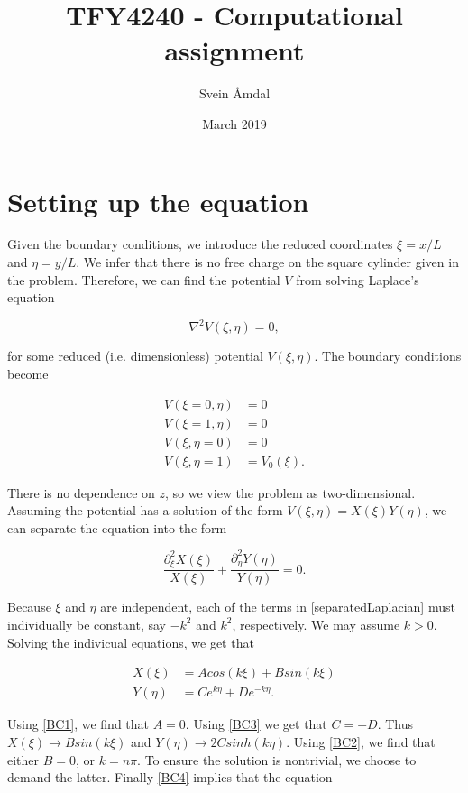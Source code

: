 \documentclass[11p, a4paper, english]{article}
\title{
\huge{TFY4240 - Computational assignment}
}
\author{Svein Åmdal}
\date{March 2019}
\begin{document}
\maketitle

\section{Setting up the equation}
Given the boundary conditions, we introduce the reduced coordinates $\xi = x/L$ and $\eta = y/L$. We infer that there is no free charge on the square cylinder given in the problem. Therefore, we can find the potential $V$ from solving Laplace's equation

\begin{equation}
\nabla^{2}V(\xi, \eta) = 0,
\end{equation}

for some reduced (i.e. dimensionless) potential $V(\xi, \eta)$. The boundary conditions become

\begin{align}
V(\xi=0, \eta) &= 0 \label{BC1} \\ 
V(\xi=1, \eta) &= 0 \label{BC2} \\
V(\xi, \eta=0) &= 0 \label{BC3} \\
V(\xi, \eta=1) &= V_{0}(\xi). \label{BC4}
\end{align}

There is no dependence on $z$, so we view the problem as two-dimensional. Assuming the potential has a solution of the form $V(\xi, \eta) = X(\xi)Y(\eta)$, we can separate the equation into the form

\begin{equation}
\frac{\partial^{2}_{\xi}X(\xi)}{X(\xi)} + \frac{\partial^{2}_{\eta}Y(\eta)}{Y(\eta)} = 0.
\label{separatedLaplacian}
\end{equation}

Because $\xi$ and $\eta$ are independent, each of the terms in \cref{separatedLaplacian} must individually be constant, say $-k^{2}$ and $k^{2}$, respectively. We may assume $k > 0$. Solving the indivicual equations, we get that

\begin{align}
X(\xi) &= Acos(k\xi)+Bsin(k\xi) \\
Y(\eta) &= Ce^{k\eta}+De^{-k\eta}.
\end{align}

Using \cref{BC1}, we find that $A = 0$. Using \cref{BC3} we get that $C=-D$. Thus $X(\xi) \rightarrow Bsin(k\xi)$ and $Y(\eta) \rightarrow 2Csinh(k\eta)$. Using \cref{BC2}, we find that either $B = 0$, or $k=n\pi$. To ensure the solution is nontrivial, we choose to demand the latter. Finally \cref{BC4} implies that the equation
\end{document}
